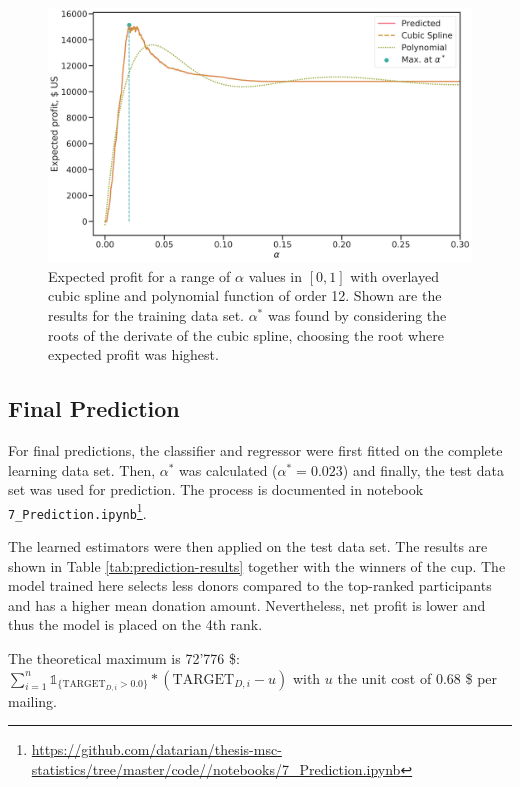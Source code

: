 \documentclass[
  11pt,
  a4paper,
  DIV=12,captions=tableheading,oneside,titlepage]{scrbook}
\begin{document}
\begin{figure}

{\centering \includegraphics[width=0.7\linewidth]{figures/predictions/comparison-alpha-profit-models} 

}

\caption{Expected profit for a range of \(\alpha\) values in \([0,1]\) with overlayed cubic spline and polynomial function of order 12. Shown are the results for the training data set. \(\alpha^*\) was found by considering the roots of the derivate of the cubic spline, choosing the root where expected profit was highest.}\label{fig:alpha-grid}
\end{figure}

\hypertarget{final-prediction}{%
\subsection{Final Prediction}\label{final-prediction}}

For final predictions, the classifier and regressor were first fitted on the complete learning data set. Then, \(\alpha^*\) was calculated (\(\alpha^* = 0.023\)) and finally, the test data set was used for prediction. The process is documented in notebook \texttt{7\_Prediction.ipynb}\footnote{\url{https://github.com/datarian/thesis-msc-statistics/tree/master/code//notebooks/7_Prediction.ipynb}}.

The learned estimators were then applied on the test data set. The results are shown in Table \ref{tab:prediction-results} together with the winners of the cup. The model trained here selects less donors compared to the top-ranked participants and has a higher mean donation amount. Nevertheless, net profit is lower and thus the model is placed on the 4th rank.

The theoretical maximum is 72'776 \$: \(\sum_{i=1}^n \mathbb{1}_{\{\text{TARGET}_{D,i} > 0.0\}}*(\text{TARGET}_{D,i} - u)\) with \(u\) the unit cost of 0.68 \$ per mailing.
\end{document}
